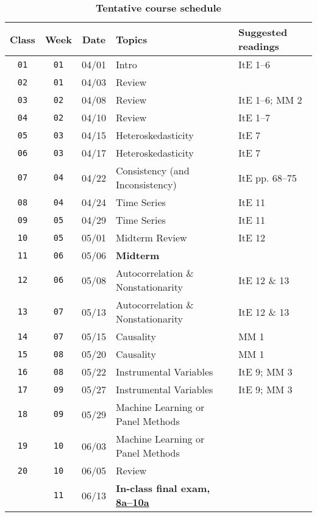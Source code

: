 \documentclass[10pt]{article}
\newcommand{\ra}[1]{\renewcommand{\arraystretch}{#1}}
\begin{document}
\begin{table}[htb]
  \centering
  \caption*{\textbf{Tentative course schedule}}
  \ra{1.5}
  \begin{tabular}{@{\extracolsep{1cm}} c c c l l @{}}
    \toprule
    Class & Week & Date & Topics & Suggested readings  \\ \toprule
    \texttt{01} & \texttt{01} & 04/01 & Intro & ItE 1--6 \\
    \texttt{02} & \texttt{01} & 04/03 & Review \\
    \texttt{03} & \texttt{02} & 04/08 & Review & ItE 1--6; MM 2 \\
    \texttt{04} & \texttt{02} & 04/10 & Review & ItE 1--7 \\
    \texttt{05} & \texttt{03} & 04/15 & Heteroskedasticity & ItE 7 \\
    \texttt{06} & \texttt{03} & 04/17 & Heteroskedasticity & ItE 7 \\
    \texttt{07} & \texttt{04} & 04/22 & Consistency (and Inconsistency) & ItE pp. 68--75  \\
    \texttt{08} & \texttt{04} & 04/24 & Time Series & ItE 11  \\
    \texttt{09} & \texttt{05} & 04/29 & Time Series & ItE 11  \\
    \texttt{10} & \texttt{05} & 05/01 & Midterm Review & ItE 12 \\ 
    \midrule
    \texttt{11} & \texttt{06} & 05/06 & \textbf{Midterm} \\ 
    \midrule
    \texttt{12} & \texttt{06} & 05/08 & Autocorrelation \& Nonstationarity & ItE 12 \& 13 \\
    \texttt{13} & \texttt{07} & 05/13 & Autocorrelation \& Nonstationarity & ItE 12 \& 13 \\
    \texttt{14} & \texttt{07} & 05/15 & Causality & MM 1 \\
    \texttt{15} & \texttt{08} & 05/20 & Causality & MM 1 \\
    \texttt{16} & \texttt{08} & 05/22 & Instrumental Variables & ItE 9; MM 3 \\
    \texttt{17} & \texttt{09} & 05/27 & Instrumental Variables & ItE 9; MM 3 \\
    \texttt{18} & \texttt{09} & 05/29 & Machine Learning or Panel Methods \\
    \texttt{19} & \texttt{10} & 06/03 & Machine Learning or Panel Methods \\
    \texttt{20} & \texttt{10} & 06/05 & Review \\
    \midrule
    \texttt{  } & \texttt{11} & 06/13 & \textbf{In-class final exam, \href{https://registrar.uoregon.edu/dates-deadlines/exams}{8a--10a}} & \\
    \bottomrule
  \end{tabular}
\end{table}
\end{document}
